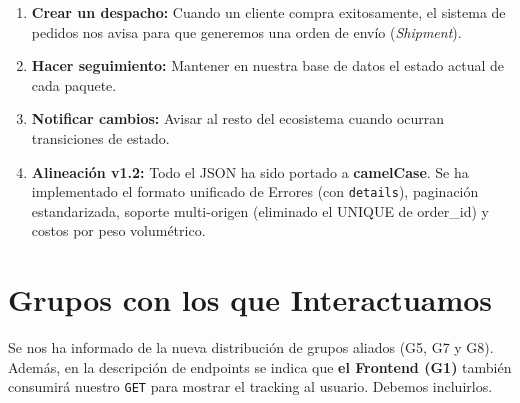 \documentclass[11pt, a4paper]{article}
\begin{document}
\begin{enumerate}[label=\textbf{\arabic*.}, leftmargin=2em]
  \item \textbf{Crear un despacho:} Cuando un cliente compra exitosamente, el sistema de pedidos nos avisa para que generemos una orden de envío (\textit{Shipment}).
  \item \textbf{Hacer seguimiento:} Mantener en nuestra base de datos el estado actual de cada paquete.
  \item \textbf{Notificar cambios:} Avisar al resto del ecosistema cuando ocurran transiciones de estado.

  \item \textbf{Alineación v1.2:} Todo el JSON ha sido portado a \textbf{camelCase}.
        Se ha implementado el formato unificado de Errores (con \texttt{details}),
        paginación estandarizada, soporte multi-origen (eliminado el UNIQUE de
        order\_id) y costos por peso volumétrico.
\end{enumerate}


\section{Grupos con los que Interactuamos}

\begin{alertbox}[title={\faExclamationTriangle\quad Corrección: Nuevos grupos y Falta G1}]
  Se nos ha informado de la nueva distribución de grupos aliados (G5, G7 y G8). Además, en la
  descripción de endpoints se indica que \textbf{el Frontend (G1)} también
  consumirá nuestro \texttt{GET} para mostrar el tracking al usuario.
  Debemos incluirlos.
\end{alertbox}
\end{document}
